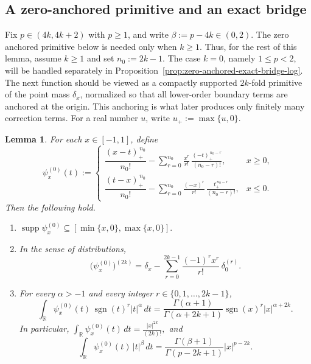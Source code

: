 \documentclass[11pt]{article}
\newtheorem{lemma}[theorem]{Lemma}
\theoremstyle{definition}
\begin{document}
\subsection{A zero-anchored primitive and an exact bridge}
Fix \(p\in(4k,4k+2)\) with \(p\ge1\), and write
\(
\beta:=p-4k\in(0,2).
\)
The zero anchored primitive below is needed only when \(k\ge1\). Thus, for the
rest of this lemma, assume \(k\ge1\) and set
\(
n_0:=2k-1.
\)
The case \(k=0\), namely \(1\le p<2\), will be handled separately in
Proposition~\ref{prop:zero-anchored-exact-bridge-log}.
The next function should be viewed as a compactly supported \(2k\)-fold primitive of the point mass \(\delta_x\), normalized so that all lower-order boundary terms are anchored at the origin. This anchoring is what later produces only finitely many correction terms. For a real number \(u\), write \( u_+:=\max\{u,0\}.\)
\begin{lemma}\label{lem:zero-anchored-primitive-log}
For each $x\in[-1,1]$, define
\[
\psi_x^{(0)}(t):=
\begin{cases}
\dfrac{(x-t)_+^{\,n_0}}{n_0!}
-
\displaystyle\sum_{r=0}^{n_0}
\frac{x^r}{r!}\,
\frac{(-t)_+^{\,n_0-r}}{(n_0-r)!},
& x\ge 0,\\[3ex]
\dfrac{(t-x)_+^{\,n_0}}{n_0!}
-
\displaystyle\sum_{r=0}^{n_0}
\frac{(-x)^r}{r!}\,
\frac{t_+^{\,n_0-r}}{(n_0-r)!},
& x\le 0.
\end{cases}
\]
Then the following hold.

\begin{enumerate}
\item[\textnormal{(i)}]
\(
\operatorname{supp}\psi_x^{(0)}
\subseteq [\min\{x,0\},\max\{x,0\}].
\)

\item[\textnormal{(ii)}]
In the sense of distributions,
\[
\bigl(\psi_x^{(0)}\bigr)^{(2k)}
=
\delta_x-\sum_{r=0}^{2k-1}\frac{(-1)^r x^r}{r!}\,\delta_0^{(r)}.
\]

\item[\textnormal{(iii)}]
For every $\alpha>-1$ and every integer $r\in\{0,1,\dots,2k-1\}$,
\[
\int_{\mathbb R}\psi_x^{(0)}(t)\,\operatorname{sgn}(t)^r|t|^\alpha\,dt
=
\frac{\Gamma(\alpha+1)}{\Gamma(\alpha+2k+1)}
\operatorname{sgn}(x)^r|x|^{\alpha+2k}.
\]
In particular,
\(
\int_{\mathbb R}\psi_x^{(0)}(t)\,dt=\frac{|x|^{2k}}{(2k)!},
\)
and
\[
\int_{\mathbb R}\psi_x^{(0)}(t)\,|t|^\beta\,dt
=
\frac{\Gamma(\beta+1)}{\Gamma(p-2k+1)}|x|^{p-2k}.
\]
\end{enumerate}
\end{lemma}
\end{document}
